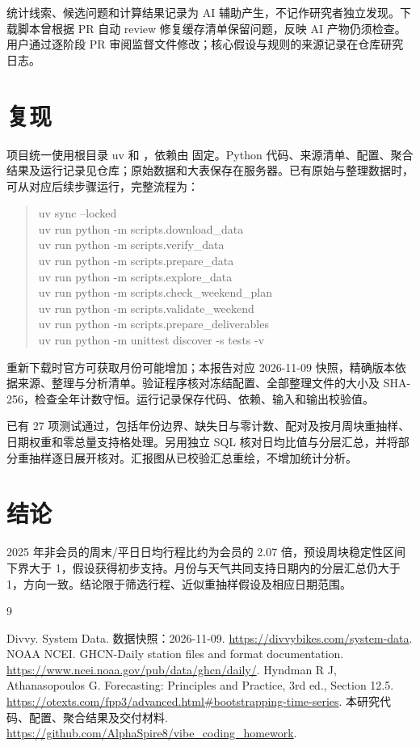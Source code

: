 \documentclass[UTF8,fontset=fandol,a4paper,zihao=-4]{ctexart}
\begin{document}
统计线索、候选问题和计算结果记录为 AI 辅助产生，不记作研究者独立发现。下载脚本曾根据 PR 自动 review 修复缓存清单保留问题，反映 AI 产物仍须检查。用户通过逐阶段 PR 审阅监督文件修改；核心假设与规则的来源记录在仓库研究日志。

\section{复现}

项目统一使用根目录 uv 和 ，依赖由  固定。Python 代码、来源清单、配置、聚合结果及运行记录见仓库\cite{repo}；原始数据和大表保存在服务器。已有原始与整理数据时，可从对应后续步骤运行，完整流程为：

\begin{quote}\small\ttfamily
uv sync --locked\\
uv run python -m scripts.download\_data\\
uv run python -m scripts.verify\_data\\
uv run python -m scripts.prepare\_data\\
uv run python -m scripts.explore\_data\\
uv run python -m scripts.check\_weekend\_plan\\
uv run python -m scripts.validate\_weekend\\
uv run python -m scripts.prepare\_deliverables\\
uv run python -m unittest discover -s tests -v
\end{quote}

重新下载时官方可获取月份可能增加；本报告对应 2026-11-09 快照，精确版本依据来源、整理与分析清单。验证程序核对冻结配置、全部整理文件的大小及 SHA-256，检查全年计数守恒。运行记录保存代码、依赖、输入和输出校验值。

已有 27 项测试通过，包括年份边界、缺失日与零计数、配对及按月周块重抽样、日期权重和零总量支持格处理。另用独立 SQL 核对日均比值与分层汇总，并将部分重抽样逐日展开核对。汇报图从已校验汇总重绘，不增加统计分析。

\section{结论}

2025 年非会员的周末/平日日均行程比约为会员的 2.07 倍，预设周块稳定性区间下界大于 1，假设获得初步支持。月份与天气共同支持日期内的分层汇总仍大于 1，方向一致。结论限于筛选行程、近似重抽样假设及相应日期范围。

\begin{thebibliography}{9}
\small
\raggedright
{} Divvy. System Data. 数据快照：2026-11-09. \url{https://divvybikes.com/system-data}.
 NOAA NCEI. GHCN-Daily station files and format documentation. \url{https://www.ncei.noaa.gov/pub/data/ghcn/daily/}.
 Hyndman R J, Athanasopoulos G. Forecasting: Principles and Practice, 3rd ed., Section 12.5. \url{https://otexts.com/fpp3/advanced.html#bootstrapping-time-series}.
 本研究代码、配置、聚合结果及交付材料. \url{https://github.com/AlphaSpire8/vibe_coding_homework}.
\end{thebibliography}
\end{document}

